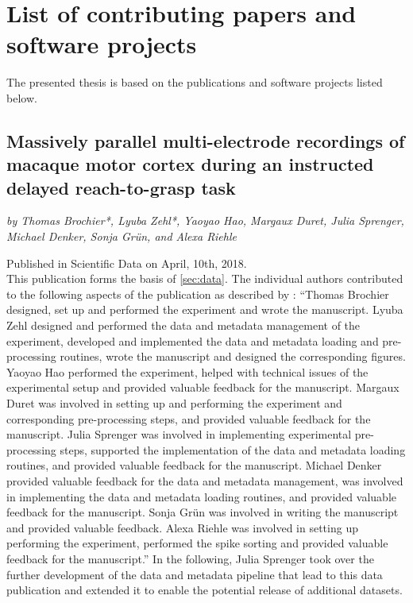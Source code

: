 \hypersetup{pageanchor=false} %

\clearpage
\pagestyle{plain}
\section*{List of contributing papers and software projects}
\label{sec:ListofPapers}


The presented thesis is based on the publications and software projects listed below.

\vspace{2cm}

\subsection*{Massively parallel multi-electrode recordings of macaque motor cortex during an instructed delayed reach-to-grasp task}
\textit{by Thomas Brochier*, Lyuba Zehl*, Yaoyao Hao, Margaux Duret, Julia Sprenger, Michael Denker, Sonja Grün, and Alexa Riehle}

Published in Scientific Data on April, 10th, 2018. \citep{Brochier_2018}\\

This publication forms the basis of \cref{sec:data}. The individual authors contributed to the following aspects of the publication as described by \citet{Zehl_2018}: ``Thomas Brochier designed, set up and performed the experiment and wrote the manuscript. Lyuba Zehl designed and performed the data and metadata management of the experiment, developed and implemented the data and metadata loading and pre-processing routines, wrote the manuscript and designed the corresponding figures. Yaoyao Hao performed the experiment, helped with technical issues of the experimental setup and provided valuable feedback for the manuscript. Margaux Duret was involved in setting up and performing the experiment and corresponding pre-processing steps, and provided valuable feedback for the manuscript. Julia Sprenger was involved in implementing experimental pre-processing steps, supported the implementation of the data and metadata loading routines, and provided valuable feedback for the manuscript. Michael Denker provided valuable feedback for the data and metadata management, was involved in implementing the data and metadata loading routines, and provided valuable feedback for the manuscript. Sonja Grün was involved in writing the manuscript and provided valuable feedback. Alexa Riehle was involved in setting up performing the experiment, performed the spike sorting and provided valuable feedback for the manuscript.'' In the following, Julia Sprenger took over the further development of the data and metadata pipeline that lead to this data publication and extended it to enable the potential release of additional datasets.\\

